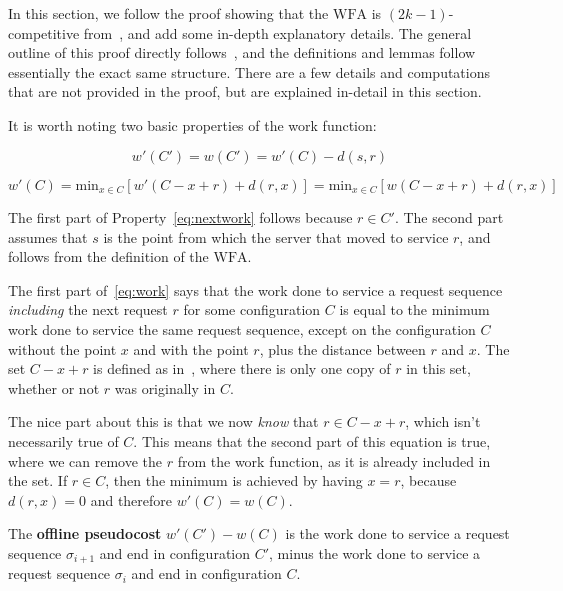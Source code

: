 In this section, we follow the proof showing that the $\mathrm{WFA}$ is $(2k-1)$-competitive from~\cite{OnlineComp1998}, and add some in-depth explanatory details. The general outline of this proof directly follows~\cite{OnlineComp1998}, and the definitions and lemmas follow essentially the exact same structure. There are a few details and computations that are not provided in the proof, but are explained in-detail in this section.

It is worth noting two basic properties of the work function:

\begin{equation}
    \label{eq:nextwork}
    w'(C') = w(C') = w'(C) - d(s,r)
\end{equation}

\begin{equation}
    \label{eq:work}
    w'(C) = \mathrm{min}_{x \in C} [w'(C - x + r) + d(r, x)] = \mathrm{min}_{x \in C} [w(C - x + r) + d(r, x)]
\end{equation}

The first part of Property~\eqref{eq:nextwork} follows because $r \in C'$. The second part assumes that $s$ is the point from which the server that moved to service $r$, and follows from the definition of the $\mathrm{WFA}$.

The first part of~\eqref{eq:work} says that the work done to service a request sequence \textit{including} the next request $r$ for some configuration $C$ is equal to the minimum work done to service the same request sequence, except on the configuration $C$ without the point $x$ and with the point $r$, plus the distance between $r$ and $x$. The set $C-x+r$ is defined as in~\cite{OnlineComp1998}, where there is only one copy of $r$ in this set, whether or not $r$ was originally in $C$. 

The nice part about this is that we now \textit{know} that $r \in C - x + r$, which isn't necessarily true of $C$. This means that the second part of this equation is true, where we can remove the $r$ from the work function, as it is already included in the set. If $r \in C$, then the minimum is achieved by having $x = r$, because $d(r,x) = 0$ and therefore $w'(C) = w(C)$.

\begin{definition}
    The \textbf{offline pseudocost} $w'(C') - w(C)$ is the work done to service a request sequence $\sigma_{i+1}$ and end in configuration $C'$, minus the work done to service a request sequence $\sigma_i$ and end in configuration $C$.
\end{definition}

